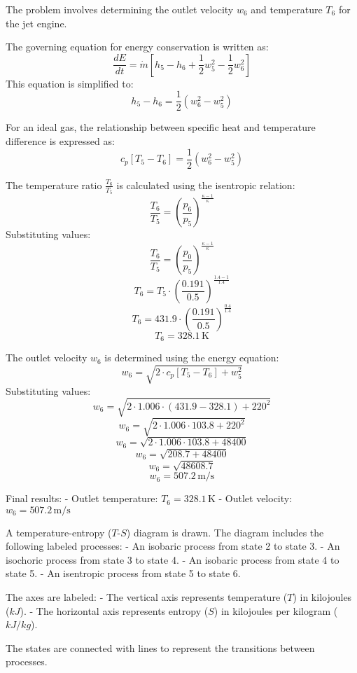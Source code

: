 The problem involves determining the outlet velocity \( w_6 \) and temperature \( T_6 \) for the jet engine.  

The governing equation for energy conservation is written as:  
\[
\frac{dE}{dt} = \dot{m} \left[ h_5 - h_6 + \frac{1}{2} w_5^2 - \frac{1}{2} w_6^2 \right]
\]  
This equation is simplified to:  
\[
h_5 - h_6 = \frac{1}{2} \left( w_6^2 - w_5^2 \right)
\]  

For an ideal gas, the relationship between specific heat and temperature difference is expressed as:  
\[
c_p \left[ T_5 - T_6 \right] = \frac{1}{2} \left( w_6^2 - w_5^2 \right)
\]  

The temperature ratio \( \frac{T_6}{T_5} \) is calculated using the isentropic relation:  
\[
\frac{T_6}{T_5} = \left( \frac{p_6}{p_5} \right)^{\frac{\kappa - 1}{\kappa}}
\]  
Substituting values:  
\[
\frac{T_6}{T_5} = \left( \frac{p_0}{p_5} \right)^{\frac{\kappa - 1}{\kappa}}
\]  
\[
T_6 = T_5 \cdot \left( \frac{0.191}{0.5} \right)^{\frac{1.4 - 1}{1.4}}
\]  
\[
T_6 = 431.9 \cdot \left( \frac{0.191}{0.5} \right)^{\frac{0.4}{1.4}}
\]  
\[
T_6 = 328.1 \, \text{K}
\]  

The outlet velocity \( w_6 \) is determined using the energy equation:  
\[
w_6 = \sqrt{2 \cdot c_p \left[ T_5 - T_6 \right] + w_5^2}
\]  
Substituting values:  
\[
w_6 = \sqrt{2 \cdot 1.006 \cdot \left( 431.9 - 328.1 \right) + 220^2}
\]  
\[
w_6 = \sqrt{2 \cdot 1.006 \cdot 103.8 + 220^2}
\]  
\[
w_6 = \sqrt{2 \cdot 1.006 \cdot 103.8 + 48400}
\]  
\[
w_6 = \sqrt{208.7 + 48400}
\]  
\[
w_6 = \sqrt{48608.7}
\]  
\[
w_6 = 507.2 \, \text{m/s}
\]  

Final results:  
- Outlet temperature: \( T_6 = 328.1 \, \text{K} \)  
- Outlet velocity: \( w_6 = 507.2 \, \text{m/s} \)

A temperature-entropy (\(T\)-\(S\)) diagram is drawn. The diagram includes the following labeled processes:  
- An isobaric process from state 2 to state 3.  
- An isochoric process from state 3 to state 4.  
- An isobaric process from state 4 to state 5.  
- An isentropic process from state 5 to state 6.  

The axes are labeled:  
- The vertical axis represents temperature (\(T\)) in kilojoules (\(kJ\)).  
- The horizontal axis represents entropy (\(S\)) in kilojoules per kilogram (\(kJ/kg\)).  

The states are connected with lines to represent the transitions between processes.